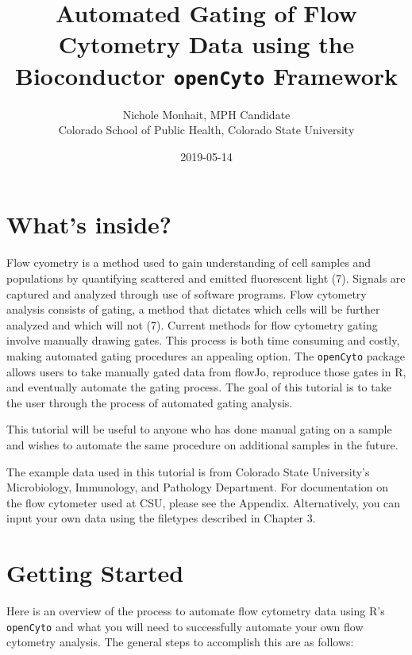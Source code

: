 \documentclass[]{book}
\title{Automated Gating of Flow Cytometry Data using the Bioconductor \texttt{openCyto} Framework}
\author{Nichole Monhait, MPH Candidate \\ Colorado School of Public Health, Colorado State University}
\date{2019-05-14}
\begin{document}
\maketitle

{
\setcounter{tocdepth}{1}
\tableofcontents
}
\hypertarget{whats-inside}{%
\chapter{What's inside?}\label{whats-inside}}

Flow cyometry is a method used to gain understanding of cell samples and populations by quantifying scattered and emitted fluorescent light (7). Signals are captured and analyzed through use of software programs. Flow cytometry analysis consists of gating, a method that dictates which cells will be further analyzed and which will not (7). Current methods for flow cytometry gating involve manually drawing gates. This process is both time consuming and costly, making automated gating procedures an appealing option. The \texttt{openCyto} package allows users to take manually gated data from flowJo, reproduce those gates in R, and eventually automate the gating process. The goal of this tutorial is to take the user through the process of automated gating analysis.

This tutorial will be useful to anyone who has done manual gating on a sample and wishes to automate the same procedure on additional samples in the future.

The example data used in this tutorial is from Colorado State University's Microbiology, Immunology, and Pathology Department. For documentation on the flow cytometer used at CSU, please see the Appendix. Alternatively, you can input your own data using the filetypes described in Chapter 3.

\hypertarget{getting-started}{%
\chapter{Getting Started}\label{getting-started}}

Here is an overview of the process to automate flow cytometry data using R's \texttt{openCyto} and what you will need to successfully automate your own flow cytometry analysis. The general steps to accomplish this are as follows:
\end{document}
